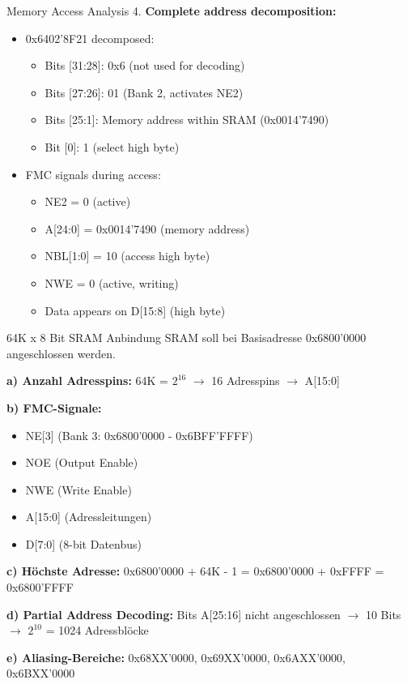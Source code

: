 \begin{example2}{Memory Access Analysis}
4. \textbf{Complete address decomposition:}
   \begin{itemize}
     \item 0x6402'8F21 decomposed:
     \begin{itemize}
       \item Bits [31:28]: 0x6 (not used for decoding)
       \item Bits [27:26]: 01 (Bank 2, activates NE2)
       \item Bits [25:1]: Memory address within SRAM (0x0014'7490)
       \item Bit [0]: 1 (select high byte)
     \end{itemize}
     \item FMC signals during access:
     \begin{itemize}
       \item NE2 = 0 (active)
       \item A[24:0] = 0x0014'7490 (memory address)
       \item NBL[1:0] = 10 (access high byte)
       \item NWE = 0 (active, writing)
       \item Data appears on D[15:8] (high byte)
     \end{itemize}
   \end{itemize}
\end{example2}

\begin{example2}{64K x 8 Bit SRAM Anbindung}
    SRAM soll bei Basisadresse 0x6800'0000 angeschlossen werden.

    \textbf{a) Anzahl Adresspins:}
    64K = $2^{16}$ $\rightarrow$ 16 Adresspins $\rightarrow$ A[15:0]
    
    \textbf{b) FMC-Signale:}
    \begin{itemize}
        \item NE[3] (Bank 3: 0x6800'0000 - 0x6BFF'FFFF)
        \item NOE (Output Enable)
        \item NWE (Write Enable)
        \item A[15:0] (Adressleitungen)
        \item D[7:0] (8-bit Datenbus)
    \end{itemize}
    
    \textbf{c) Höchste Adresse:}
    0x6800'0000 + 64K - 1 = 0x6800'0000 + 0xFFFF = 0x6800'FFFF
    
    \textbf{d) Partial Address Decoding:}
    Bits A[25:16] nicht angeschlossen $\rightarrow$ 10 Bits $\rightarrow$ $2^{10}$ = 1024 Adressblöcke
    
    \textbf{e) Aliasing-Bereiche:}
    0x68XX'0000, 0x69XX'0000, 0x6AXX'0000, 0x6BXX'0000
\end{example2}

